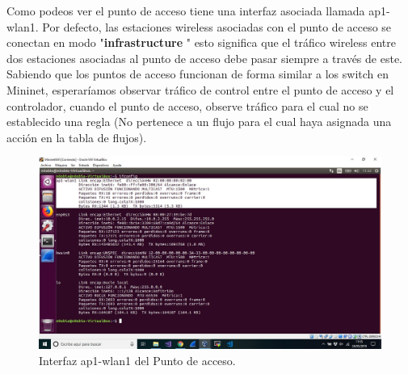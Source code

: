 Como podeos ver el punto de acceso tiene una interfaz asociada llamada ap1-wlan1. Por defecto, las estaciones wireless asociadas con el punto de acceso se conectan en modo "\textbf{infrastructure} " esto significa que el tráfico wireless entre dos estaciones asociadas al punto de acceso debe pasar siempre a través de este. Sabiendo que los puntos de acceso funcionan de forma similar a los switch en Mininet, esperaríamos observar tráfico de control entre el punto de acceso y el controlador, cuando el punto de acceso,  observe tráfico para el cual no se establecido una regla (No pertenece a un flujo para el cual haya asignada una acción en la tabla de flujos). 

\begin{figure}[!htb]
  \centering
    \includegraphics[width=0.9\linewidth]{./img/6.JPG}
    \caption{Interfaz ap1-wlan1 del Punto de acceso.}
  \label{fig:yo}
\end{figure}
\newpage
